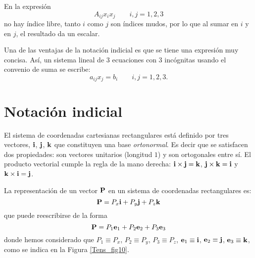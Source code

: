 
\bigskip

\begin{example}

En la expresión $$A_{ij}x_ix_j  \qquad  i,j=1,2,3$$ no hay índice libre, tanto $i$ como $j$ son índices mudos, por lo que al  sumar en $i$ y en $j$, el resultado da un escalar.
\end{example}

\bigskip 



\begin{remark}
Una de las ventajas de la notación indicial es que se tiene una expresión muy concisa. Así, un sistema  lineal de $3$ ecuaciones con $3$ incógnitas  usando el convenio de suma se escribe:
$$ a_{ij}x_j=b_i  \qquad  i,j=1,2,3.$$
\end{remark}

\section{Notación indicial}




El sistema de coordenadas cartesianas rectangulares está definido por tres vectores, $\bold{i}$, $\bold{j}$, $\bold{k}$ que constituyen una base \textit{ortonormal}. Es decir que se satisfacen  dos propiedades:  son vectores  unitarios (longitud $1$) y  son ortogonales entre sí. El producto vectorial cumple la regla de la mano derecha: $ \bold{i} \times \bold{j}=\bold{k}  $, $ \bold{j} \times \bold{k}=\bold{i}  $ y $ \bold{k} \times \bold{i}=\bold{j}  $.

\bigskip

La representación de un vector $\bold{P}$ en un sistema de coordenadas rectangulares es:
\begin{equation}
\bold{P}= P_x \bold{i} + P_y \bold{j}  + P_z \bold{k}
\end{equation}
que puede reescribirse de la forma
\begin{equation}
\bold{P}= P_1 \bold{e}_1 + P_2 \bold{e}_2 + P_3 \bold{e}_3
\label{veccart}
\end{equation}
donde hemos considerado que $P_1 \equiv P_x$, $P_2 \equiv P_y$, $P_3 \equiv P_z$, $\bold{e}_1 \equiv \bold{i}$, $\bold{e}_2 \equiv \bold{j }$, $\bold{e}_3 \equiv \bold{k}$, como se indica en la Figura \ref{Tens_fig10}.

